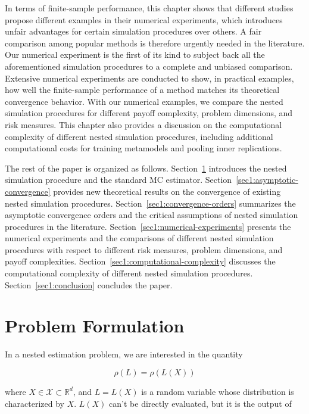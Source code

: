 In terms of finite-sample performance, this chapter shows that different studies propose different examples in their numerical experiments, which introduces unfair advantages for certain simulation procedures over others. 
A fair comparison among popular methods is therefore urgently needed in the literature. 
Our numerical experiment is the first of its kind to subject back all the aforementioned simulation procedures to a complete and unbiased comparison. 
Extensive numerical experiments are conducted to show, in practical examples, how well the finite-sample performance of a method matches its theoretical convergence behavior. 
With our numerical examples, we compare the nested simulation procedures for different payoff complexity, problem dimensions, and risk measures. 
This chapter also provides a discussion on the computational complexity of different nested simulation procedures, including additional computational costs for training metamodels and pooling inner replications.

The rest of the paper is organized as follows.
Section~\ref{sec1:problem-formulation} introduces the nested simulation procedure and the standard MC estimator.
Section~\ref{sec1:asymptotic-convergence} provides new theoretical results on the convergence of existing nested simulation procedures.
Section~\ref{sec1:convergence-orders} summarizes the asymptotic convergence orders and the critical assumptions of nested simulation procedures in the literature.
Section~\ref{sec1:numerical-experiments} presents the numerical experiments and the comparisons of different nested simulation procedures with respect to different risk measures, problem dimensions, and payoff complexities.
Section~\ref{sec1:computational-complexity} discusses the computational complexity of different nested simulation procedures.
Section~\ref{sec1:conclusion} concludes the paper.

\section{Problem Formulation} \label{sec1:problem-formulation}

In a nested estimation problem, we are interested in the quantity 

$$\rho(L) = \rho(L(X))$$

where $X \in \mathcal{X} \subset \mathbb{R}^d$, and $L = L(X)$ is a random variable whose distribution is characterized by $X$.
$L(X)$ can't be directly evaluated, but it is the output of 

